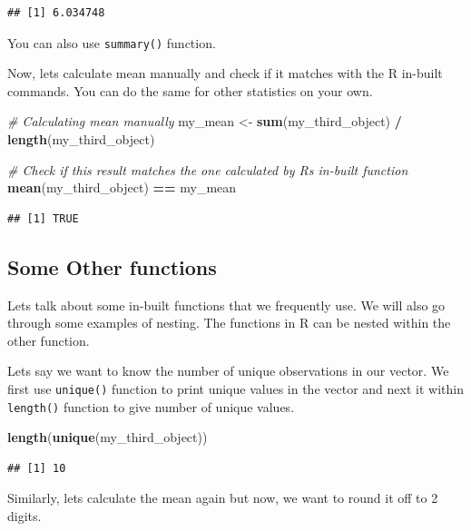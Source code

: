 \documentclass[
]{article}
\newenvironment{Shaded}{\begin{snugshade}}{\end{snugshade}}
\newcommand{\CommentTok}[1]{\textcolor[rgb]{0.56,0.35,0.01}{\textit{#1}}}
\newcommand{\FunctionTok}[1]{\textcolor[rgb]{0.13,0.29,0.53}{\textbf{#1}}}
\newcommand{\NormalTok}[1]{#1}
\newcommand{\OtherTok}[1]{\textcolor[rgb]{0.56,0.35,0.01}{#1}}
\newcommand{\SpecialCharTok}[1]{\textcolor[rgb]{0.81,0.36,0.00}{\textbf{#1}}}
\begin{document}
\begin{verbatim}
## [1] 6.034748
\end{verbatim}

You can also use \texttt{summary()} function.

Now, lets calculate mean manually and check if it matches with the R
in-built commands. You can do the same for other statistics on your own.

\begin{Shaded}
\begin{Highlighting}[]
\CommentTok{\# Calculating mean manually}
\NormalTok{my\_mean }\OtherTok{\textless{}{-}} \FunctionTok{sum}\NormalTok{(my\_third\_object) }\SpecialCharTok{/} \FunctionTok{length}\NormalTok{(my\_third\_object)}

\CommentTok{\# Check if this result matches the one calculated by R\textquotesingle{}s in{-}built function}
\FunctionTok{mean}\NormalTok{(my\_third\_object) }\SpecialCharTok{==}\NormalTok{ my\_mean}
\end{Highlighting}
\end{Shaded}

\begin{verbatim}
## [1] TRUE
\end{verbatim}

\subsection{Some Other functions}\label{some-other-functions}

Lets talk about some in-built functions that we frequently use. We will
also go through some examples of nesting. The functions in R can be
nested within the other function.

Lets say we want to know the number of unique observations in our
vector. We first use \texttt{unique()} function to print unique values
in the vector and next it within \texttt{length()} function to give
number of unique values.

\begin{Shaded}
\begin{Highlighting}[]
\FunctionTok{length}\NormalTok{(}\FunctionTok{unique}\NormalTok{(my\_third\_object))}
\end{Highlighting}
\end{Shaded}

\begin{verbatim}
## [1] 10
\end{verbatim}

Similarly, lets calculate the mean again but now, we want to round it
off to 2 digits.
\end{document}
